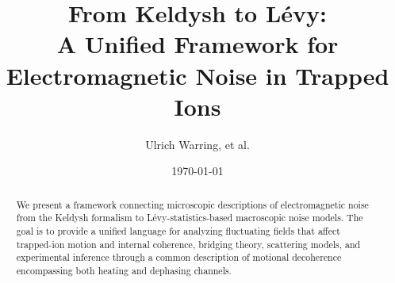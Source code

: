 \documentclass[11pt,a4paper]{article}
\title{From Keldysh to Lévy:\\
  A Unified Framework for Electromagnetic Noise in Trapped Ions}
\author[1]{Ulrich Warring, et al.}
\affil[1]{Physikalisches Institut, Universität Freiburg, Germany}
\date{\today}
\begin{document}
\maketitle

\begin{abstract}
We present a framework connecting microscopic descriptions of electromagnetic noise
from the Keldysh formalism to L\'evy-statistics-based macroscopic noise models.
The goal is to provide a unified language for analyzing fluctuating fields
that affect trapped-ion motion and internal coherence,
bridging theory, scattering models, and experimental inference through a
common description of motional decoherence encompassing both heating and
dephasing channels.
\end{abstract}















\end{document}
